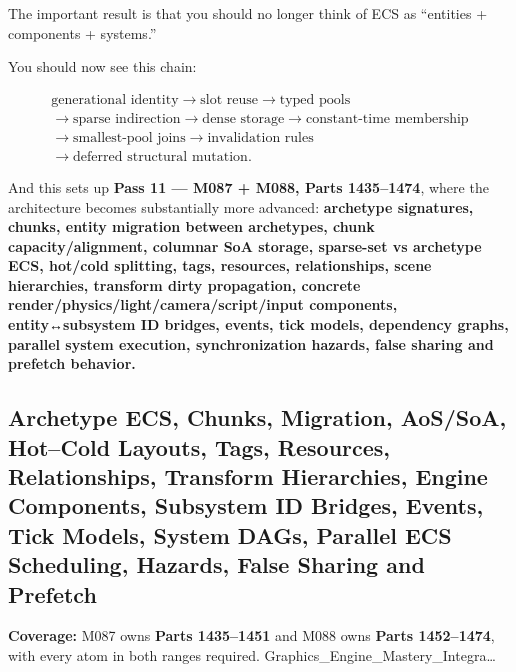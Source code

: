 The important result is that you should no longer think of ECS as ``entities + components + systems.''

You should now see this chain:

\[\boxed{\begin{gathered}\text{generational identity}\rightarrow\text{slot reuse}\rightarrow\text{typed pools}\\\rightarrow\text{sparse indirection}\rightarrow\text{dense storage}\rightarrow\text{constant-time membership}\\\rightarrow\text{smallest-pool joins}\rightarrow\text{invalidation rules}\\\rightarrow\text{deferred structural mutation}.\end{gathered}}\]

And this sets up \textbf{Pass 11 --- M087 + M088, Parts 1435--1474}, where the architecture becomes substantially more advanced: \textbf{archetype signatures, chunks, entity migration between archetypes, chunk capacity/alignment, columnar SoA storage, sparse-set vs archetype ECS, hot/cold splitting, tags, resources, relationships, scene hierarchies, transform dirty propagation, concrete render/physics/light/camera/script/input components, entity↔subsystem ID bridges, events, tick models, dependency graphs, parallel system execution, synchronization hazards, false sharing and prefetch behavior.}

\subsection{Archetype ECS, Chunks, Migration, AoS/SoA, Hot--Cold Layouts, Tags, Resources, Relationships, Transform Hierarchies, Engine Components, Subsystem ID Bridges, Events, Tick Models, System DAGs, Parallel ECS Scheduling, Hazards, False Sharing and Prefetch}\label{05-engine-i-ch015-archetype-ecs-chunks-migration-aossoa-hotcold-layouts-tags-resources-relationships-transform-hierarchies-engine-components-subsystem-id-bridges-events-tick-models-system-dags-parallel-ecs-scheduling-hazards-false-sharing-and-prefetch}

\hypertarget{05-engine-i-ch015-archetype-ecs-chunks-migration-aossoa-hotcold-layouts-tags-resources-relationships-transform-hierarchies-engine-components-subsystem-id-bridges-events-tick-models-system-dags-parallel-ecs-scheduling-hazards-false-sharing-and-prefetch}{}

\textbf{Coverage:} M087 owns \textbf{Parts 1435--1451} and M088 owns \textbf{Parts 1452--1474}, with every atom in both ranges required. Graphics\_Engine\_Mastery\_Integra\ldots{}

